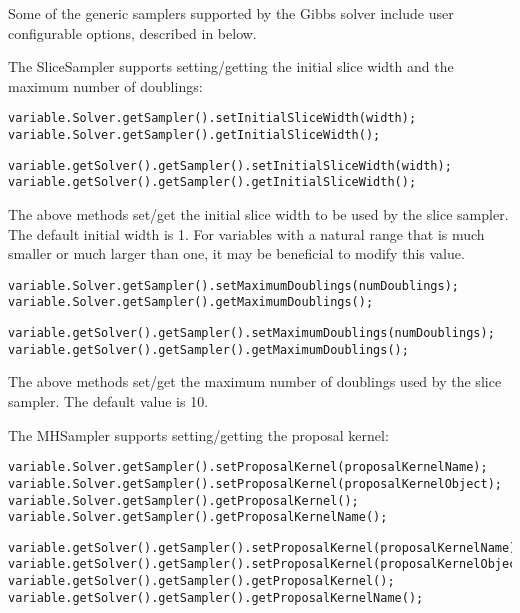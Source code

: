 
Some of the generic samplers supported by the Gibbs solver include user configurable options, described in below.

The SliceSampler supports setting/getting the initial slice width and the maximum number of doublings:

\ifmatlab
\begin{lstlisting}
variable.Solver.getSampler().setInitialSliceWidth(width);
variable.Solver.getSampler().getInitialSliceWidth();
\end{lstlisting}
\fi

\ifjava
\begin{lstlisting}
variable.getSolver().getSampler().setInitialSliceWidth(width);
variable.getSolver().getSampler().getInitialSliceWidth();
\end{lstlisting}
\fi

The above methods set/get the initial slice width to be used by the slice sampler.  The default initial width is 1.  For variables with a natural range that is much smaller or much larger than one, it may be beneficial to modify this value.

\ifmatlab
\begin{lstlisting}
variable.Solver.getSampler().setMaximumDoublings(numDoublings);
variable.Solver.getSampler().getMaximumDoublings();
\end{lstlisting}
\fi

\ifjava
\begin{lstlisting}
variable.getSolver().getSampler().setMaximumDoublings(numDoublings);
variable.getSolver().getSampler().getMaximumDoublings();
\end{lstlisting}
\fi

The above methods set/get the maximum number of doublings used by the slice sampler.  The default value is 10.

The MHSampler supports setting/getting the proposal kernel:

\ifmatlab
\begin{lstlisting}
variable.Solver.getSampler().setProposalKernel(proposalKernelName);
variable.Solver.getSampler().setProposalKernel(proposalKernelObject);
variable.Solver.getSampler().getProposalKernel();
variable.Solver.getSampler().getProposalKernelName();
\end{lstlisting}
\fi

\ifjava
\begin{lstlisting}
variable.getSolver().getSampler().setProposalKernel(proposalKernelName);
variable.getSolver().getSampler().setProposalKernel(proposalKernelObject);
variable.getSolver().getSampler().getProposalKernel();
variable.getSolver().getSampler().getProposalKernelName();
\end{lstlisting}
\fi

